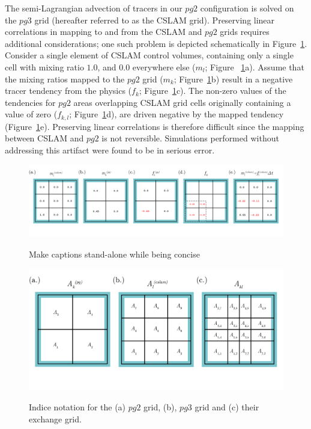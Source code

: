 \documentclass{agujournal}
\begin{document}
The semi-Lagrangian advection of tracers in our $pg2$ configuration is solved on the $pg3$ grid (hereafter referred to as the CSLAM grid). Preserving linear correlations in mapping to and from the CSLAM and $pg2$ grids requires additional considerations; one such problem is depicted schematically in Figure~\ref{fig:alg-schematic}. Consider a single element of CSLAM control volumes, containing only a single cell with mixing ratio $1.0$, and $0.0$ everywhere else ($m_l$; Figure ~\ref{fig:alg-schematic}a). Assume that the mixing ratios mapped to the $pg2$ grid ($m_k$; Figure~\ref{fig:alg-schematic}b) result in a negative tracer tendency from the physics ($f_k$; Figure~\ref{fig:alg-schematic}c). The non-zero values of the tendencies for $pg2$ areas overlapping CSLAM grid cells originally containing a value of zero ($f_{k,l}$; Figure~\ref{fig:alg-schematic}d), are driven negative by the mapped tendency (Figure~\ref{fig:alg-schematic}e). Preserving linear correlations is therefore difficult since the mapping between CSLAM and $pg2$ is not reversible. Simulations performed without addressing this artifact were found to be in serious error.

\begin{figure}[t]
\begin{center}
\noindent\includegraphics[width=30pc,angle=0]{figs/alg-schematic.png}\\
\end{center}
\caption{Make captions stand-alone while being concise}
\label{fig:alg-schematic}
\end{figure}



\begin{figure}[t]
\begin{center}
\noindent\includegraphics[width=30pc,angle=0]{figs/area-schematic.png}\\
\end{center}
\caption{Indice notation for the (a) $pg2$ grid, (b), $pg3$ grid and (c) their exchange grid.}
\label{fig:area-schematic}
\end{figure}
\end{document}
